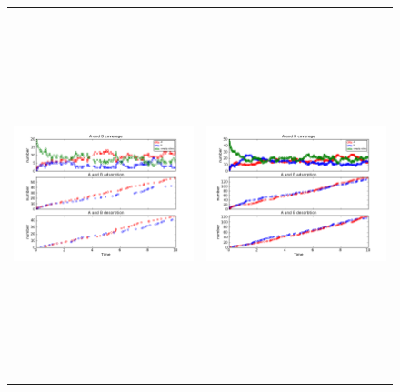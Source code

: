 \documentclass[11pt]{article}
\begin{document}
\setlength{\unitlength}{1in}
\begin{figure}[h!]
\begin{tabular}{cc}
\includegraphics[width=3.5in, height=4.2in]{./coadsorb/AtoBcoadsorb2x10_301_allsamek__A5_EA5E3_1.png} &
\includegraphics[width=3.5in, height=4.2in]{./coadsorb/AtoBcoadsorb5x10_301_allsamek__A5_EA5E3_1.png} \\

\end{tabular}
\end{figure}
\end{document}

